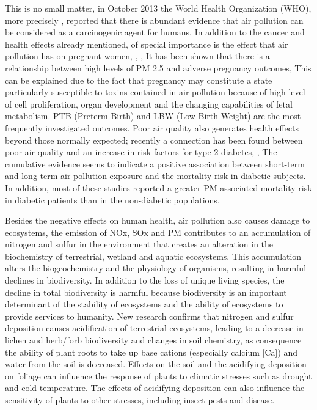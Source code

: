 \documentclass[APA,STIX1COL]{WileyNJD-v2}
\begin{document}
This is no small matter, in October 2013 the World Health Organization (WHO), more precisely ,\cite{IARC} reported that there is abundant evidence that air pollution can be considered as a carcinogenic agent for humans. In addition to the cancer and health effects already mentioned, of special importance is the effect that air pollution has on pregnant women, \cite{Keplac}, \cite{Laurent},\cite{Xiao}
It has been shown that there is a relationship between high levels of PM 2.5 and adverse pregnancy outcomes, This  can be explained due to the fact that pregnancy may constitute a state particularly susceptible to toxins contained in air pollution because of high level of cell proliferation, organ development and the changing capabilities of fetal metabolism. PTB (Preterm Birth) and LBW (Low Birth Weight) are the most frequently investigated outcomes. Poor air quality also generates health effects beyond those normally expected; recently a connection has been found between poor air quality and an increase in risk factors for type 2 diabetes, \cite{Thiering}, \cite{Lim} The cumulative evidence seems to indicate a positive association between short-term and long-term air pollution exposure and the mortality risk in diabetic subjects. In addition, most of these studies reported a greater PM-associated mortality risk in diabetic patients than in the non-diabetic populations.

Besides  the negative effects on human health, air pollution also causes damage to ecosystems, the emission of NOx, SOx and PM contributes to an accumulation of nitrogen and sulfur in the environment that creates an alteration in the biochemistry of terrestrial, wetland and aquatic ecosystems. This accumulation alters the biogeochemistry and the physiology of organisms, resulting in harmful declines in biodiversity. In addition to the loss of unique living species, the decline in total biodiversity is harmful because biodiversity is an important determinant of the stability of ecosystems and the ability of ecosystems to provide services to humanity. New research confirms that nitrogen and sulfur deposition causes acidification of terrestrial ecosystems, leading to a decrease in lichen and herb/forb biodiversity and changes in soil chemistry, as consequence the ability of plant roots to take up base cations (especially calcium [Ca]) and water from the soil is decreased. Effects on the soil and the acidifying deposition on foliage can influence the response of plants to climatic stresses such as drought and cold temperature. The effects of acidifying deposition can also influence the sensitivity of plants to other stresses, including insect pests and disease.\cite{EPA}
\end{document}
